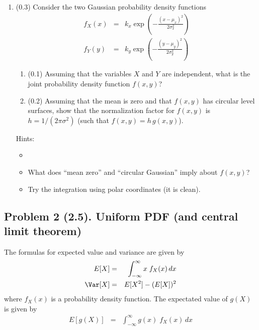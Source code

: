 \documentclass[11pt,titlepage,fleqn]{article}
\begin{document}
\begin{enumerate}
\item (0.3) Consider the two Gaussian probability density functions
%
\begin{eqnarray}
f_X(x) &=& k_x \exp\left(-\frac{(x-\mu_x)^2}{2\sigma_x^2} \right)
\\
f_Y(y) &=& k_y \exp\left(-\frac{(y-\mu_y)^2}{2\sigma_y^2} \right)
\end{eqnarray}
%
\begin{enumerate}
\item (0.1) Assuming that the variables $X$ and $Y$ are independent, what is the joint probability density function $f(x,y)$?
\item (0.2) Assuming that the mean is zero and that $f(x,y)$ has circular level surfaces, show that the normalization factor for $f(x,y)$ is $h = 1/(2\pi\sigma^2)$ (such that $f(x,y) = h\,g(x,y)$).
\end{enumerate}

Hints:
\begin{itemize}
\item \citet[][eq. B.28]{Aster}
\item What does ``mean zero'' and ``circular Gaussian'' imply about $f(x,y)$?
\item Try the integration using polar coordinates (it is clean).
\end{itemize}


\end{enumerate}


\subsection*{Problem 2 (2.5). Uniform PDF (and central limit theorem)}

The formulas for expected value and variance are given by
%
\begin{eqnarray}
E[X] &=& \int_{-\infty}^{\infty} x\;f_X(x) \,dx
\label{EX}
\\
\Var[X] &=& E[X^2] - (E[X])^2
\label{var}
\end{eqnarray}
%
where $f_X(x)$ is a probability density function. The expectated value of $g(X)$ is given by
%
\begin{eqnarray}
E[g(X)] &=& \int_{-\infty}^{\infty} g(x)\;f_X(x) \,dx
\label{Egx}
\end{eqnarray}

\end{document}
